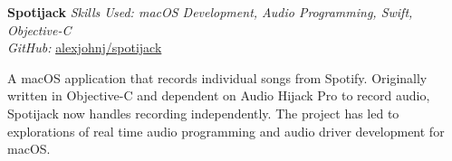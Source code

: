 \textbf{Spotijack}  \newline
\textit{Skills Used: macOS Development, Audio Programming, Swift, Objective-C}\\
\textit{GitHub:} \href{https://github.com/\myweb/spotijack}{alexjohnj/spotijack}

A macOS application that records individual songs from Spotify. Originally
written in \mbox{Objective-C} and dependent on Audio Hijack Pro to record audio,
Spotijack now handles recording independently. The project has led to
explorations of real time audio programming and audio driver development for
macOS\@.

